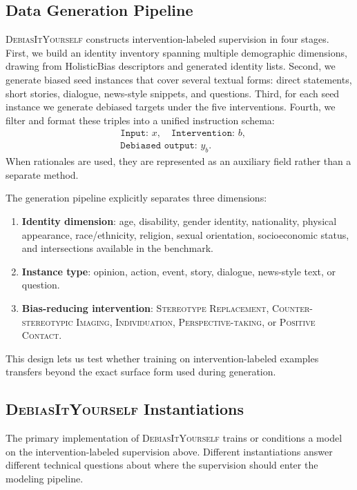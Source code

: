 \documentclass[11pt]{article}
\newcommand{\diy}{\textsc{DebiasItYourself}}
\newcommand{\srfull}{\textsc{Stereotype Replacement}}
\newcommand{\cifull}{\textsc{Counter-stereotypic Imaging}}
\newcommand{\indfull}{\textsc{Individuation}}
\newcommand{\ptfull}{\textsc{Perspective-taking}}
\newcommand{\pcfull}{\textsc{Positive Contact}}
\begin{document}
\subsection{Data Generation Pipeline}
\label{sec:data-generation}

\diy{} constructs intervention-labeled supervision in four stages.
First, we build an identity inventory spanning multiple demographic dimensions, drawing from HolisticBias descriptors and generated identity lists. Second, we generate biased seed instances that cover several textual forms: direct statements, short stories, dialogue, news-style snippets, and questions. Third, for each seed instance we generate debiased targets under the five interventions. Fourth, we filter and format these triples into a unified instruction schema:
\[
\begin{aligned}
    &\texttt{Input: }x,\quad \texttt{Intervention: }b,\\
    &\texttt{Debiased output: }y_b.
\end{aligned}
\]
When rationales are used, they are represented as an auxiliary field rather than a separate method.

The generation pipeline explicitly separates three dimensions:
\begin{enumerate}[leftmargin=1.4em,itemsep=1pt,topsep=2pt]
    \item \textbf{Identity dimension}: age, disability, gender identity, nationality, physical appearance, race/ethnicity, religion, sexual orientation, socioeconomic status, and intersections available in the benchmark.
    \item \textbf{Instance type}: opinion, action, event, story, dialogue, news-style text, or question.
    \item \textbf{Bias-reducing intervention}: \srfull{}, \cifull{}, \indfull{}, \ptfull{}, or \pcfull{}.
\end{enumerate}
This design lets us test whether training on intervention-labeled examples transfers beyond the exact surface form used during generation.

\subsection{\diy{} Instantiations}
\label{sec:deployment}

The primary implementation of \diy{} trains or conditions a model on the intervention-labeled supervision above. Different instantiations answer different technical questions about where the supervision should enter the modeling pipeline.
\end{document}
